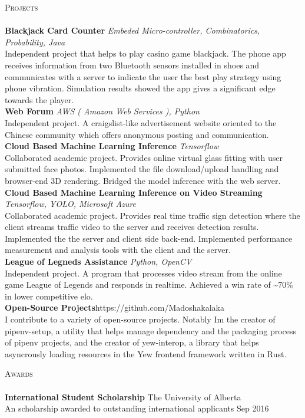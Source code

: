 \documentclass[a4paper]{article}
\newcommand{\lineunder} {
    \vspace*{-8pt} \\
    \hspace*{-18pt} \hrulefill \\
}
\newcommand{\header} [1] {
    {\hspace*{-18pt}\vspace*{6pt} \textsc{#1}}
    \vspace*{-6pt} \lineunder
}
\begin{document}
\header{Projects}
{\textbf{Blackjack Card Counter}} {\sl Embeded Micro-controller, Combinatorics, Probability, Java} \\
Independent project that helps to play casino game blackjack. The phone app receives information from two Bluetooth sensors installed in shoes and communicates with a server to indicate the user the best play strategy using phone vibration. Simulation results showed the app gives a significant edge towards the player.\\
\vspace*{2mm}
{\textbf{Web Forum}} {\sl AWS ( Amazon Web Services ), Python} \\
Independent project. A craigslist-like advertisement website oriented to the Chinese community which offers anonymous posting and communication.\\
\vspace*{2mm}
{\textbf{Cloud Based Machine Learning Inference}} {\sl Tensorflow} \\
Collaborated academic project. Provides online virtual glass fitting with user submitted face photos. Implemented the file download/upload handling and browser-end 3D rendering. Bridged the model inference with the web server.\\
\vspace*{2mm}
{\textbf{Cloud Based Machine Learning Inference on Video Streaming}} {\sl Tensorflow, YOLO, Microsoft Azure} \\
Collaborated academic project. Provides real time traffic sign detection where the client streams traffic video to the server and receives detection results. Implemented the the server and client side back-end. Implemented performance measurement and analysis tools with the client and the server.\\
\vspace*{2mm}
{\textbf{League of Legneds Assistance}} {\sl Python, OpenCV} \\
Independent project. A program that processes video stream from the online game League of Legends and responds in realtime. Achieved a win rate of \textasciitilde{}70\% in lower competitive elo.\\
\vspace*{2mm}
{\textbf{Open-Source Projects}}\hfill https://github.com/Madoshakalaka\\
I contribute to a variety of open-source projects. Notably I\textquotesingle{}m the creator of pipenv-setup, a utility that helps manage dependency and the packaging process of pipenv projects, and the creator of yew-interop, a library that helps asyncrously loading resources in the Yew frontend framework written in Rust.\\
\vspace*{2mm}

\header{Awards}
\textbf{International Student Scholarship} \hfill The University of Alberta\\
An scholarship awarded to outstanding international applicants \hfill Sep 2016\\
\vspace*{2mm}

\ 
\end{document}
